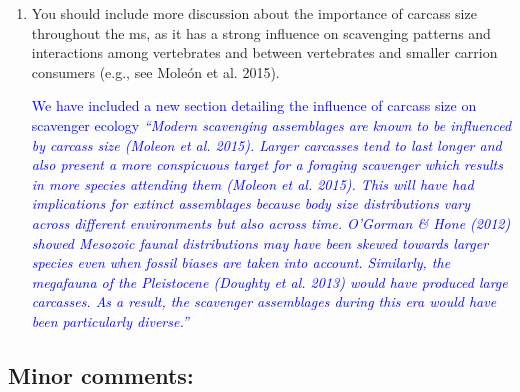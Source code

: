 \documentclass[12pt,letterpaper]{article}
\begin{document}
{\begin{enumerate}
 Page 11, 1st sentence: see Kane et al. (2014) and Mole\'{o}n et al. (2014 Biol. Rev.) for inter-specific interactions.\\
 Page 11, 4th sentence: Kane et al. (2014) is not appropriate here because it is about inter-specific interactions; use Cort\'{e}s-Avizanda et al. (2014) instead.\\
 Page 14, 2nd paragraph, 1st sentence: see also Mole\'{o}n et al. (2014 Biol. Rev.) and Pereira et al. (2014).\\
 Page 14, 2nd paragraph, 2nd sentence: see better Pereira et al. (2014) and P\'{e}riquet et al. (2015). \\
 Page 14, bottom paragraph, 3rd sentence: you may also consider Moreno-Opo et al. (2016).\\
 Page 15, 2nd paragraph, 2nd sentence: see also Mole\'{o}n et al. (2014 Biol. Rev.) and Pereira et al. (2014).

\textcolor{blue}{All of these references have been added.}

\item{You should include more discussion about the importance of carcass size throughout the ms, as it has a strong influence on scavenging patterns and interactions among vertebrates and between vertebrates and smaller carrion consumers (e.g., see Mole\'{o}n et al. 2015).}

\textcolor{blue}{We have included a new section detailing the influence of carcass size on scavenger ecology \textit{``Modern scavenging assemblages are known to be influenced by carcass size (Moleon et al. 2015). 
Larger carcasses tend to last longer and also present a more conspicuous target for a foraging scavenger which results in more species attending them (Moleon et al. 2015).
This will have had implications for extinct assemblages because body size distributions vary across different environments but also across time. 
O'Gorman \& Hone (2012) showed Mesozoic faunal distributions may have been skewed towards larger species even when fossil biases are taken into account. 
Similarly, the megafauna of the Pleistocene (Doughty et al. 2013) would have produced large carcasses. 
As a result, the scavenger assemblages during this era would have been particularly diverse.''}}

\end{enumerate}

\subsection{Minor comments:}

}
\end{document}
